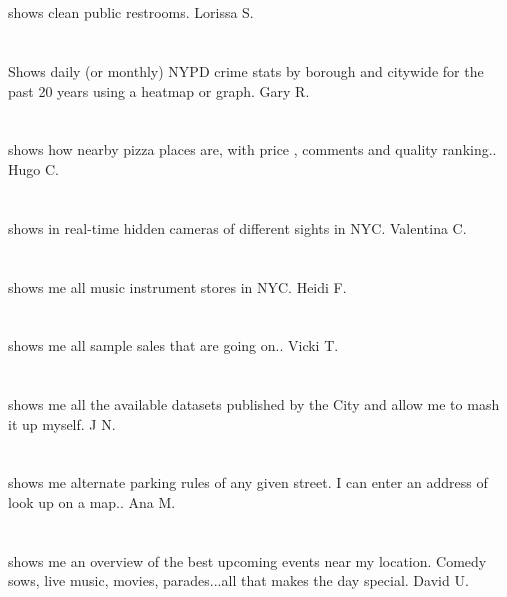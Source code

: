 \section{} shows clean public restrooms. Lorissa S.
\section{}Shows daily (or monthly)  NYPD crime stats by borough and citywide for the past 20 years using a heatmap or graph. Gary R.
\section{}shows how nearby pizza places are,  with price ,  comments and quality ranking.. Hugo C.
\section{}shows in real-time hidden cameras of different sights in NYC. Valentina C.
\section{}shows me all music instrument stores in NYC. Heidi F.
\section{}shows me all sample sales that are going on.. Vicki T.
\section{}shows me all the available datasets published by the City and allow me to mash it up myself. J N.
\section{}shows me alternate parking rules of any given street. I can enter an address of look up on a map.. Ana M.
\section{}shows me an overview of the best upcoming events near my location. Comedy sows,  live music,  movies,  parades...all that makes the day special. David U.
